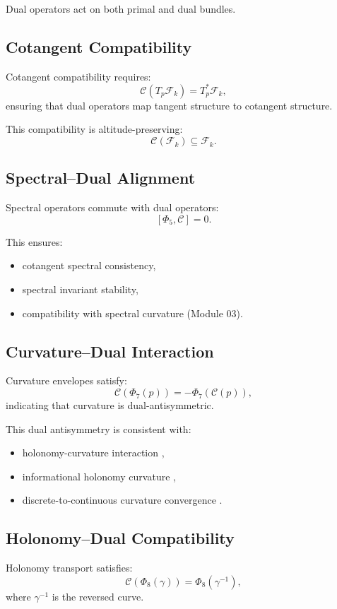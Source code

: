 Dual operators act on both primal and dual bundles.

\subsection{Cotangent Compatibility}
Cotangent compatibility requires:
\[
\mathcal{C}(T_p\mathcal{F}_k) = T_p^\ast\mathcal{F}_k,
\]
ensuring that dual operators map tangent structure to cotangent structure.

This compatibility is altitude-preserving:
\[
\mathcal{C}(\mathcal{F}_k) \subseteq \mathcal{F}_k.
\]

\subsection{Spectral–Dual Alignment}
Spectral operators commute with dual operators:
\[
[\Phi_5, \mathcal{C}] = 0.
\]

This ensures:
\begin{itemize}
    \item cotangent spectral consistency,
    \item spectral invariant stability,
    \item compatibility with spectral curvature (Module 03).
\end{itemize}

\subsection{Curvature–Dual Interaction}
Curvature envelopes satisfy:
\[
\mathcal{C}(\Phi_7(p)) = -\Phi_7(\mathcal{C}(p)),
\]
indicating that curvature is dual-antisymmetric.

This dual antisymmetry is consistent with:
\begin{itemize}
    \item holonomy-curvature interaction ,
    \item informational holonomy curvature ,
    \item discrete-to-continuous curvature convergence .
\end{itemize}

\subsection{Holonomy–Dual Compatibility}
Holonomy transport satisfies:
\[
\mathcal{C}(\Phi_8(\gamma)) = \Phi_8(\gamma^{-1}),
\]
where $\gamma^{-1}$ is the reversed curve.

